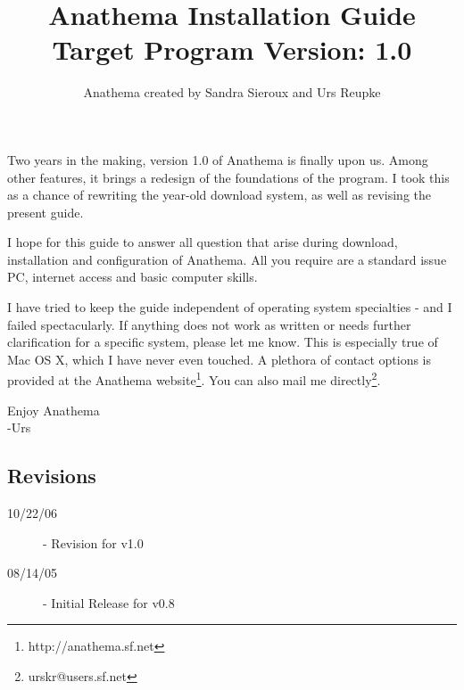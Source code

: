 \documentclass[]{article}
\title{Anathema Installation Guide\\ Target Program Version: 1.0}
\author{Anathema created by Sandra Sieroux and Urs Reupke}
\date{}
\begin{document}
\sffamily
\maketitle
\tableofcontents
\bigskip
Two years in the making, version 1.0 of Anathema is finally upon us. Among other features, it brings a redesign of the foundations of the program. I took this as a chance of rewriting the year-old download system, as well as revising the present guide. 

I hope for this guide to answer all question that arise during download, installation and configuration of Anathema. All you require are a standard issue PC, internet access and basic computer skills.

I have tried to keep the guide independent of operating system specialties - and I failed spectacularly. If anything does not work as written or needs further clarification for a specific system, please let me know. This is especially true of Mac OS X, which I have never even touched. A plethora of contact options is provided at the Anathema website\footnote{http://anathema.sf.net}. You can also mail me directly\footnote{urskr@users.sf.net}.
\begin{flushright}
Enjoy Anathema\\
	-Urs
\end{flushright}

\begin{appendix}
\section*{Revisions}
\begin{description}
\item[10/22/06] - Revision for v1.0
\item[08/14/05] - Initial Release for v0.8
\end{description}
\end{appendix}
\end{document}
